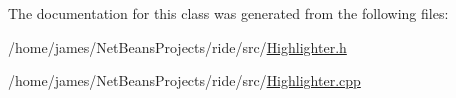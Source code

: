 The documentation for this class was generated from the following files\-:\begin{DoxyCompactItemize}
\item 
/home/james/\-Net\-Beans\-Projects/ride/src/\hyperlink{_highlighter_8h}{Highlighter.\-h}\item 
/home/james/\-Net\-Beans\-Projects/ride/src/\hyperlink{_highlighter_8cpp}{Highlighter.\-cpp}\end{DoxyCompactItemize}

